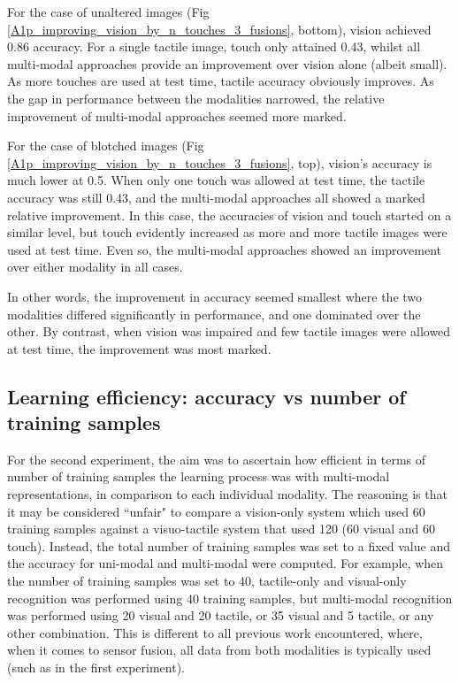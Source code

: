 \documentclass[9pt,technote]{IEEEtran}  %
\begin{document}
For the case of unaltered images (Fig \ref{A1p_improving_vision_by_n_touches_3_fusions}, bottom), vision achieved 0.86 accuracy. For a single tactile image, touch only attained 0.43, whilst all multi-modal approaches provide an improvement over vision alone (albeit small). As more touches are used at test time, tactile accuracy obviously improves. As the gap in performance between the modalities narrowed, the relative improvement of multi-modal approaches seemed more marked. 

For the case of blotched images (Fig \ref{A1p_improving_vision_by_n_touches_3_fusions}, top), vision's accuracy is much lower at 0.5. When only one touch was allowed at test time, the tactile accuracy was still 0.43, and the multi-modal approaches all showed a marked relative improvement.
In this case, the accuracies of vision and touch started on a similar level, but touch evidently increased as more and more tactile images were used at test time. Even so, the multi-modal approaches showed an improvement over either modality in all cases. 

In other words, the improvement in accuracy seemed smallest where the two modalities differed significantly in performance, and one dominated over the other. By contrast, when vision was impaired and few tactile images were allowed at test time, the improvement was most marked.
\begin{figure}
	\centering
\end{figure}

\subsection{Learning efficiency: accuracy vs number of training samples}

For the second experiment, the aim was to ascertain how efficient in terms of number of training samples the learning process was with multi-modal representations, in comparison to each individual modality. The reasoning is that it may be considered ``unfair" to compare a vision-only system which used 60 training samples against a visuo-tactile system that used 120 (60 visual and 60 touch). Instead, the total number of training samples was set to a fixed value and the accuracy for uni-modal and multi-modal were computed. For example, when the number of training samples was set to 40, tactile-only and visual-only recognition was performed using 40 training samples, but multi-modal recognition was performed using 20 visual and 20 tactile, or 35 visual and 5 tactile, or any other combination. This is different to all previous work encountered, where, when it comes to sensor fusion, all data from both modalities is typically used (such as in the first experiment). 
\end{document}
